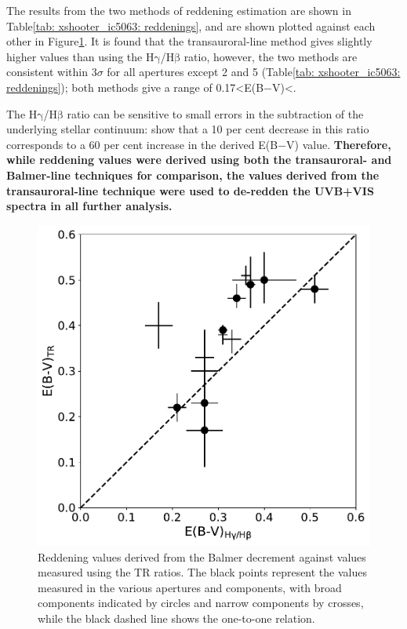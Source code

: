 The results from the two methods of reddening estimation are shown in Table\;\ref{tab: xshooter_ic5063: reddenings}, and are shown plotted against each other in \mbox{Figure\;\ref{fig: xshooter_ic5063: tr_balmer_reddening}}. It is found that the transauroral-line method gives slightly higher values than using the H$\mathrm{\gamma}$/H$\mathrm{\beta}$ ratio, however, the two methods are consistent within 3$\sigma$ for all apertures except 2 and 5 (Table\;\ref{tab: xshooter_ic5063: reddenings}); both methods give a range of \mbox{0.17\;\textless\;E(B$-$V)\;\textless{}}.

The H$\mathrm{\gamma}$/H$\mathrm{\beta}$ ratio can be sensitive to small errors in the subtraction of the underlying stellar continuum: \citet{Rose2018} show that a 10 per cent decrease in this ratio corresponds to a 60 per cent increase in the derived E(B$-$V) value. \textbf{Therefore, while reddening values were derived using both the transauroral- and Balmer-line techniques for comparison, the values derived from the transauroral-line technique were used to de-redden the UVB+VIS spectra in all further analysis.}

\begin{figure}[!t]
	\centering
	\includegraphics[width=0.75\linewidth]{figures/xshooter_ic5063/tr_balmer_reddening.pdf}
	\caption[Reddening values derived from the Balmer decrement plotted against values measured using the transauroral line technique.]{Reddening values derived from the Balmer decrement against values measured using the TR ratios. The black points represent the values measured in the various apertures and components, with broad components indicated by circles and narrow components by crosses, while the black dashed line shows the one-to-one relation. }
	\label{fig: xshooter_ic5063: tr_balmer_reddening}
\end{figure} 

